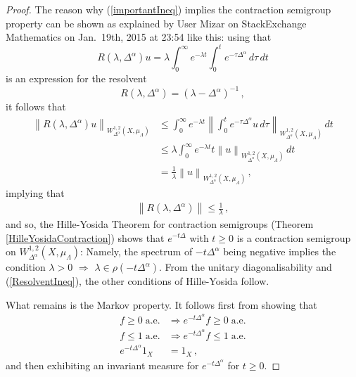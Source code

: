\documentclass[a4paper,draft]{ZbRad}
\theoremstyle{plain}
\theoremstyle{definition}
\numberwithin{equation}{section}
\renewcommand{\le}{\leqslant}\renewcommand{\leq}{\leqslant}
\renewcommand{\ge}{\geqslant}\renewcommand{\geq}{\geqslant}
\newcommand{\norm}[1]{\left\|#1\right\|}
\begin{document}
\begin{proof}
\smallskip
The reason why (\ref{importantIneq}) implies the contraction semigroup property can be
shown as explained by User Mizar on StackExchange Mathematics on Jan.\
19th, 2015 at 23:54 like this: 
using that
\[
R(\lambda,\Delta^\alpha)u =\lambda
\int_0^\infty e^{-\lambda t}
\int_0^te^{-\tau\Delta^\alpha}\,d\tau\,dt
\]
is an expression for the resolvent
\[
R(\lambda,\Delta^\alpha) = (\lambda-\Delta^\alpha)^{-1}\,,
\]
it follows that
\begin{align*}
\norm{R(\lambda,\Delta^\alpha)u}_{W^{1,2}_{\Delta^\alpha}(X,\mu_\Lambda)}
&\le\int_0^\infty e^{-\lambda t} 
\norm{\int_0^t e^{-\tau\Delta^\alpha}u\,d\tau}_{W^{1,2}_{\Delta^\alpha}(X,\mu_\Lambda)}\,dt
\\
&\le \lambda \int_0^\infty e^{-\lambda t}t\norm{u}_{W^{1,2}_{\Delta^\alpha}(X,\mu_\Lambda)}\,dt
\\
&=\frac{1}{\lambda}\norm{u}_{W^{1,2}_{\Delta^\alpha}(X,\mu_\Lambda)}\,,
\end{align*}
implying that
\begin{align}\label{ResolventIneq}
\norm{R(\lambda,\Delta^\alpha)}\le\frac{1}{\lambda}\,,
\end{align}
and so, the Hille-Yosida Theorem for contraction semigroups (Theorem \ref{HilleYosidaContraction})
shows that $e^{-t\Delta}$ with $t\ge0$ is a contraction semigroup on $W^{1,2}_{\Delta^\alpha}(X,\mu_\Lambda)$: Namely, the spectrum of $-t\Delta^\alpha$ being negative implies the condition $\lambda>0$ $\Rightarrow $ $\lambda\in\rho(-t\Delta^\alpha)$. From the unitary diagonalisability and (\ref{ResolventIneq}), the other conditions of Hille-Yosida follow.

\smallskip
What remains is the Markov property. It
follows first from showing that
\begin{align}\label{positive}
f \ge 0\; \text{a.e.}&\Rightarrow e^{-t\Delta^\alpha} f \ge 0\;\text{a.e.}
\\\label{lessThanOne}
f \le 1\; \text{a.e.}&\Rightarrow e^{-t\Delta^\alpha} f \le 1\; \text{a.e.}
\\\label{indicator}
e^{-t\Delta^\alpha}1_X &= 1_X\,,
\end{align}
and then exhibiting an invariant measure for $e^{-t\Delta^\alpha}$ for $t\ge0$.


\end{proof}
\end{document}
